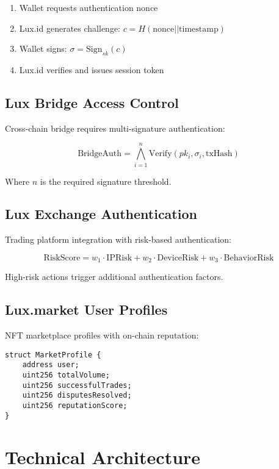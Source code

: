 \documentclass[11pt,a4paper]{article}
\begin{document}
\begin{enumerate}
    \item Wallet requests authentication nonce
    \item Lux.id generates challenge: $c = H(\text{nonce} || \text{timestamp})$
    \item Wallet signs: $\sigma = \text{Sign}_{sk}(c)$
    \item Lux.id verifies and issues session token
\end{enumerate}

\subsection{Lux Bridge Access Control}

Cross-chain bridge requires multi-signature authentication:

\begin{equation}
    \text{BridgeAuth} = \bigwedge_{i=1}^{n} \text{Verify}(pk_i, \sigma_i, \text{txHash})
\end{equation}

Where $n$ is the required signature threshold.

\subsection{Lux Exchange Authentication}

Trading platform integration with risk-based authentication:

\begin{equation}
    \text{RiskScore} = w_1 \cdot \text{IPRisk} + w_2 \cdot \text{DeviceRisk} + w_3 \cdot \text{BehaviorRisk}
\end{equation}

High-risk actions trigger additional authentication factors.

\subsection{Lux.market User Profiles}

NFT marketplace profiles with on-chain reputation:

\begin{lstlisting}[language=Solidity]
struct MarketProfile {
    address user;
    uint256 totalVolume;
    uint256 successfulTrades;
    uint256 disputesResolved;
    uint256 reputationScore;
}
\end{lstlisting}

\section{Technical Architecture}
\end{document}
